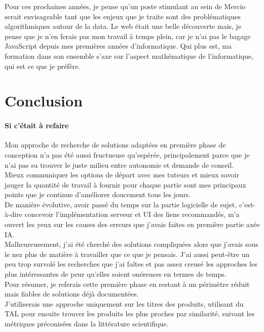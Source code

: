 \documentclass{rapportCS}
\begin{document}
Pour ces prochaines années, je pense qu'un poste stimulant au sein de Mercio serait 
envisageable tant que les enjeux que je traite sont des problématiques algorithmiques
autour de la data. Le web était une belle découverte mais, je pense que je n'en ferais
pas mon travail à temps plein, car je n'ai pas le bagage JavaScript depuis mes
premières années d'informatique. Qui plus est, ma formation dans son ensemble
s'axe sur l'aspect mathématique de l'informatique, qui est ce que je préfère.

\newpage
\section{Conclusion}
\paragraph{Si c'était à refaire}
Mon approche de recherche de solutions adaptées en première phase de conception
n'a pas été aussi fructueuse qu'espérée,
principalement parce que je n'ai pas su trouver le juste milieu
entre autonomie et demande de conseil.\\

Mieux communiquer les options de départ avec mes tuteurs et mieux savoir jauger la 
quantité de travail à fournir pour chaque partie sont mes principaux points que
je continue d'améliorer doucement tous les jours.\\

De manière évolutive, avoir passé du temps sur la partie logicielle de sujet,
c'est-à-dire concevoir l'implémentation serveur et UI des liens recommandés,
m'a ouvert les yeux sur les causes des erreurs que j'avais faites en première partie
axée IA.\\

Malheureusement, j'ai été cherché des solutions compliquées alors que j'avais sous le nez plus de 
matière à travailler que ce que je pensais. J'ai aussi peut-être un peu trop survolé les
recherches que j'ai faîtes et pas assez creusé les approches les plus intéressantes de peur qu'elles
soient onéreuses en termes de temps.\\

Pour résumer, je referais cette première phase en restant à un périmètre réduit mais fiables de 
solutions déjà documentées.\\
J'utiliserais une approche uniquement sur les titres des produits, utilisant du TAL pour ensuite
trouver les produits les plus proches par similarité, suivant les métriques préconisées dans la
littérature scientifique.\\
\end{document}
